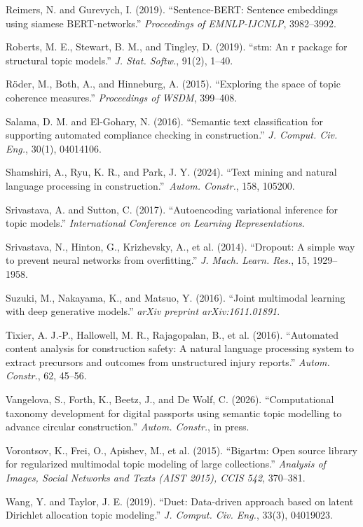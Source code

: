 \documentclass[Journal,letterpaper,NoLists]{ascelike-new}
\begin{document}
Reimers, N. and Gurevych, I. (2019). ``Sentence-{BERT}: Sentence embeddings using siamese {BERT}-networks.'' \emph{Proceedings of EMNLP-IJCNLP}, 3982--3992.

Roberts, M. E., Stewart, B. M., and Tingley, D. (2019). ``stm: An r package for structural topic models.'' \emph{J. Stat. Softw.}, 91(2), 1--40.

R\"oder, M., Both, A., and Hinneburg, A. (2015). ``Exploring the space of topic coherence measures.'' {\em Proceedings of WSDM}, 399--408.

Salama, D. M. and El-Gohary, N. (2016). ``Semantic text classification for supporting automated compliance checking in construction.'' \emph{J. Comput. Civ. Eng.}, 30(1), 04014106.

Shamshiri, A., Ryu, K. R., and Park, J. Y. (2024). ``Text mining and natural language processing in construction.''\ \emph{Autom. Constr.}, 158, 105200.

Srivastava, A. and Sutton, C. (2017). ``Autoencoding variational inference for topic models.'' {\em International Conference on Learning Representations}.

Srivastava, N., Hinton, G., Krizhevsky, A., et al. (2014). ``Dropout: A simple way to prevent neural networks from overfitting.'' \emph{J. Mach. Learn. Res.}, 15, 1929--1958.

Suzuki, M., Nakayama, K., and Matsuo, Y. (2016). ``Joint multimodal learning with deep generative models.'' {\em arXiv preprint arXiv:1611.01891}.

Tixier, A. J.-P., Hallowell, M. R., Rajagopalan, B., et al. (2016). ``Automated content analysis for construction safety: A natural language processing system to extract precursors and outcomes from unstructured injury reports.'' \emph{Autom. Constr.}, 62, 45--56.

Vangelova, S., Forth, K., Beetz, J., and De Wolf, C. (2026). ``Computational taxonomy development for digital passports using semantic topic modelling to advance circular construction.'' \emph{Autom. Constr.}, in press.

Vorontsov, K., Frei, O., Apishev, M., et al. (2015). ``Bigartm: Open source library for regularized multimodal topic modeling of large collections.'' \emph{Analysis of Images, Social Networks and Texts (AIST 2015), CCIS 542}, 370--381.

Wang, Y. and Taylor, J. E. (2019). ``Duet: Data-driven approach based on latent {Dirichlet} allocation topic modeling.'' \emph{J. Comput. Civ. Eng.}, 33(3), 04019023.
\end{document}
